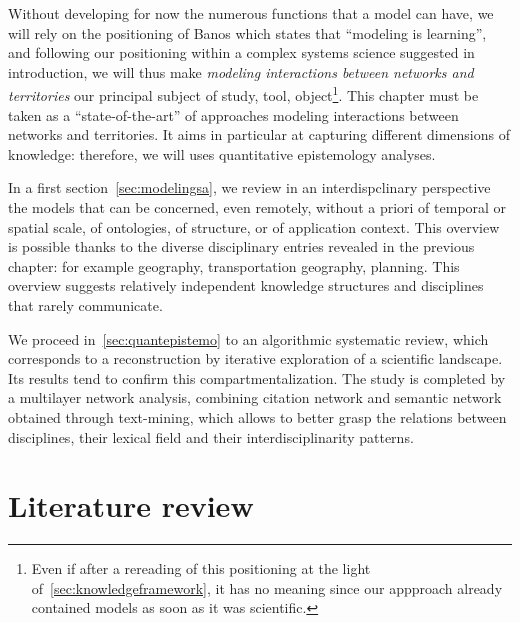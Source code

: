 \documentclass[galley]{jtlu-article-2col}
\begin{document}
Without developing for now the numerous functions that a model can have, we will rely on the positioning of Banos which states that ``modeling is learning'', and following our positioning within a complex systems science suggested in introduction, we will thus make \emph{modeling interactions between networks and territories} our principal subject of study, tool, object\footnote{Even if after a rereading of this positioning at the light of~\ref{sec:knowledgeframework}, it has no meaning since our appproach already contained models as soon as it was scientific.}. This chapter must be taken as a ``state-of-the-art'' of approaches modeling interactions between networks and territories. It aims in particular at capturing different dimensions of knowledge: therefore, we will uses quantitative epistemology analyses.




In a first section~\ref{sec:modelingsa}, we review in an interdispclinary perspective the models that can be concerned, even remotely, without a priori of temporal or spatial scale, of ontologies, of structure, or of application context. This overview is possible thanks to the diverse disciplinary entries revealed in the previous chapter: for example geography, transportation geography, planning. This overview suggests relatively independent knowledge structures and disciplines that rarely communicate.


We proceed in~\ref{sec:quantepistemo} to an algorithmic systematic review, which corresponds to a reconstruction by iterative exploration of a scientific landscape. Its results tend to confirm this compartmentalization. The study is completed by a multilayer network analysis, combining citation network and semantic network obtained through text-mining, which allows to better grasp the relations between disciplines, their lexical field and their interdisciplinarity patterns.






\section{Literature review}

\end{document}
